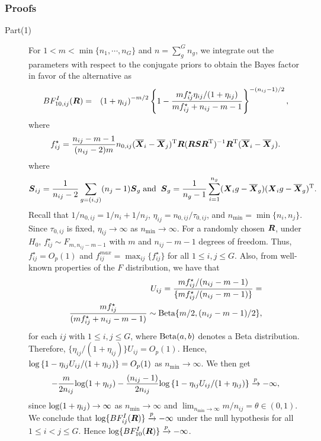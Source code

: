\documentclass[12pt]{article}
\def\log{\hbox{log}}
\def\Beta{\hbox{Beta}}
\def\log{\hbox{log}}
\def\Beta{\hbox{Beta}}
\def\bse{\begin{eqnarray*}}
\def\ese{\end{eqnarray*}}
\def\be{\begin{eqnarray}}
\def\ee{\end{eqnarray}}
\def\trans{^{\rm T}}
\newcommand{\uR}       {\mbox{\boldmath$R$}}
\newcommand{\uS}       {\mbox{\boldmath$S$}}
\newcommand{\uX}       {\mbox{\boldmath$X$}}
\begin{document}
\subsubsection{Proofs}
\begin{description}
\item[Part(1)]
For $1 < m < \min\{ n_1, \cdots, n_{G} \}$ and $n = \sum^{G}_{g}n_g$, we integrate out the parameters with respect to the conjugate priors to obtain the Bayes factor in favor of the alternative as
\be
BF^{I}_{10,ij}(\uR) &=&\left(1 + \eta_{ij} \right)^{-m/2} \left\{ 1 -  \frac{ m f_{ij}^{\star} \eta_{ij}/(1 + \eta_{ij}) }{ m f_{ij}^{\star}  + n_{ij} - m - 1} \right\}^{-(n_{ij}-1)/2} \nonumber,
\ee
where
\bse
f_{ij}^{\star}  = \frac{n_{ij} - m - 1}{(n_{ij}-2)m} n_{0,ij}(\overline{\uX}_i - \overline{\uX}_j)\trans \uR(\uR \uS\uR\trans )^{-1}\uR\trans (\overline{\uX}_{i} - \overline{\uX}_{j}).
\ese
where $$ \uS_{ij} = \frac{1}{n_{ij} - 2} \sum_{g=(i,j)}(n_j -1)\uS_{g}\; \text{and} \;\; \uS_g = \frac{1}{n_g - 1}\sum^{n_g}_{i=1}(\uX_ig - \overline{\uX}_{g})(\uX_ig - \overline{\uX}_{g})\trans.$$
Recall that $1/n_{0,ij} = 1/n_i + 1/n_j$, $\eta_{ij} = n_{0,ij}/\tau_{0,ij}$, and $n_{\min} = \min\{n_i, n_j\}$.
Since $\tau_{0,ij}$ is fixed, $\eta_{ij} \rightarrow \infty$ as $n_{\min} \to \infty$.
For a randomly chosen $\uR$, under $H_{0}$, $f_{ij}^{\star}  \sim F_{m, n_{ij}-m-1}$ with $m$ and $n_{ij} - m -1$ degrees of freedom.
Thus, $f_{ij}^{\star} = O_{p}(1)$ and $f^{max}_{ij} = \max_{ij}\{ f^{\star}_{ij}\}$ for all $1 \leq i, j \leq G$.
Also, from well-known properties of the $F$ distribution, we have that
\bse
U_{ij} = \frac{m f_{ij}^{\star}/(n_{ij}-m-1 )}{\{m f_{ij}^{\star}/(n_{ij} - m - 1 )\}} = \nonumber \\
  \frac{m f_{ij}^{\star}}{( m f_{ij}^{\star} + n_{ij} - m-1)} \sim \Beta\{m/2, (n_{ij}-m-1)/2 \},
\ese
for each $ij$ with $1 \leq i, j \leq G$, where $\Beta(a, b)$ denotes a Beta distribution.
Therefore, $\{\eta_{ij}/(1 + \eta_{ij})\} U_{ij} = O_{p}(1)$.
Hence, $\log\left\{ 1 -  \eta_{ij} U_{ij}/(1 + \eta_{ij}) \right\} = O_{p}(1)$ as $n_{\min} \to \infty$. We then get
\bse
-\frac{m}{2n_{ij}}\log(1 + \eta_{ij}) -\frac{(n_{ij}-1)}{2n_{ij}}\log\left\{ 1 -  \eta_{ij} U_{ij}/(1 + \eta_{ij}) \right\} \xrightarrow[]{p} -\infty,
\ese
since $\log(1 + \eta_{ij}) \rightarrow \infty$ as $n_{\min} \rightarrow \infty$ and $\lim_{n_{\min} \rightarrow \infty} m/n_{ij} = \theta \in (0, 1)$.
We conclude that $\log\{BF^{I}_{ij}(\uR)\} \xrightarrow[]{p} -\infty$ under the null hypothesis for all $1 \leq i < j \leq G$.
Hence $\log\{BF^{I}_{10}(\uR)\} \xrightarrow[]{p} -\infty$.


\end{description}
\end{document}
